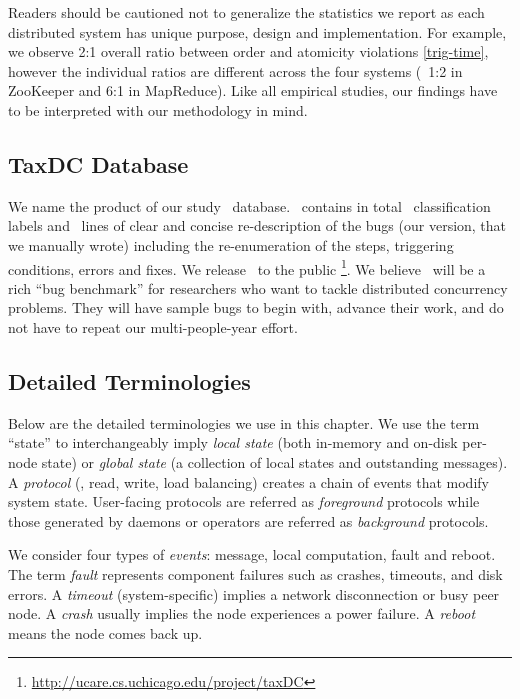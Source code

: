 Readers should be cautioned not to generalize the statistics we report as each
distributed system has unique purpose, design and implementation.
%
For example, we observe 2:1 overall ratio between order and atomicity violations
\sec\ref{trig-time}, however the individual ratios are different across the four
systems (\eg\ 1:2 in ZooKeeper and 6:1 in MapReduce).  
%
Like all empirical studies, our findings have to be interpreted with our
methodology in mind.


\subsection{TaxDC Database}
\label{met-db}

We name the product of our study \tdc\ database.  \tdc\ contains in
total \numTagsAll\ classification labels and \numDescLOC\ lines of
clear and concise re-description of the bugs (our version, that we
manually wrote) including the re-enumeration of the steps, triggering
conditions, errors and fixes.
%
We release \tdc\ to the public
\footnote{\url{http://ucare.cs.uchicago.edu/project/taxDC}}.  We believe \tdc\
will be a rich ``bug benchmark'' for researchers who want to tackle distributed
concurrency problems.  They will have sample bugs to begin with, advance their
work, and do not have to repeat our multi-people-year effort.


\vfive %

\subsection{Detailed Terminologies}
\label{met-pres}

Below are the detailed terminologies we use in this chapter.
We use the term ``state'' to interchangeably imply {\em local state}
(both in-memory and on-disk per-node state) or {\em global state}
(a collection of local states and outstanding messages).
%
A {\em protocol} (\eg, read, write, load balancing) creates a chain of
events that modify system state.
%
User-facing protocols are referred as {\em foreground} protocols while
those generated by daemons or operators are referred
as {\em background} protocols.


We consider four types of {\em events}: message, local computation,
fault and reboot.  The term {\em fault} represents component failures
such as crashes, timeouts, and disk errors.
%
A {\em timeout} (system-specific) implies a network disconnection
or busy peer node.
%
A {\em crash} usually implies the node experiences a power failure. %
%
A {\em reboot} means the node comes back up.


